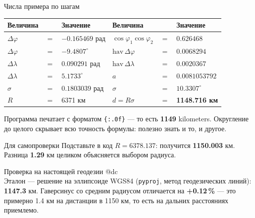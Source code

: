 \documentclass[aspectratio=169,10pt]{beamer}
\makeatletter
\newcommand{\num}[1]{\textcolor{codered}{\textbf{#1}}}
\newcommand{\usePic}[1]{\expandafter\csname pic@#1\endcsname}
\makeatother
\begin{document}
\begin{frame}{Числа примера по шагам}
\footnotesize
{}
\begin{tabular}{@{}lrl@{\qquad}lrl@{}}
  \toprule
  Величина & & Значение & Величина & & Значение \\
  \midrule
  $\Delta\varphi$ & $=$ & $-0.165469$ рад & $\cos\varphi_1\cos\varphi_2$ & $=$ & $0.626468$ \\
  $\Delta\varphi$ & $=$ & $-9.4807^\circ$ & $\mathrm{hav}\,\Delta\varphi$ & $=$ & $0.0068294$ \\
  $\Delta\lambda$ & $=$ & $0.090291$ рад & $\mathrm{hav}\,\Delta\lambda$ & $=$ & $0.0020367$ \\
  $\Delta\lambda$ & $=$ & $5.1733^\circ$ & $a$ & $=$ & $0.0081053792$ \\
  $\sigma$ & $=$ & $0.1803039$ рад & $\sigma$ & $=$ & $10.3307^\circ$ \\
  $R$ & $=$ & 6371 км & $d = R\sigma$ & $=$ & \textbf{1148.716 км} \\
  \bottomrule
\end{tabular}

\vspace{0.8em}
{\small Программа печатает с форматом \texttt{\{:.0f\}} --- то есть
\num{1149} kilometers. Округление до целого скрывает всю точность формулы:
полезно знать и то, и другое.}

\vspace{0.5em}
\begin{block}{Для самопроверки}\small
  Подставьте в код $R = 6378.137$: получится \num{1150.003} км.
  Разница \num{1.29} км целиком объясняется выбором радиуса.
\end{block}
\end{frame}

\begin{frame}{Проверка на настоящей геодезии}
\centering
\usePic{dc}\\[0.1cm]
\footnotesize
Эталон --- решение на эллипсоиде WGS84 (\texttt{pyproj}, метод геодезических
линий): \num{1147.3} км. Гаверсинус со средним радиусом отличается на
\num{+0.12\,\%} --- это примерно 1.4 км на дистанции в 1150 км, то есть
на дальних расстояниях приемлемо.
\end{frame}
\end{document}
